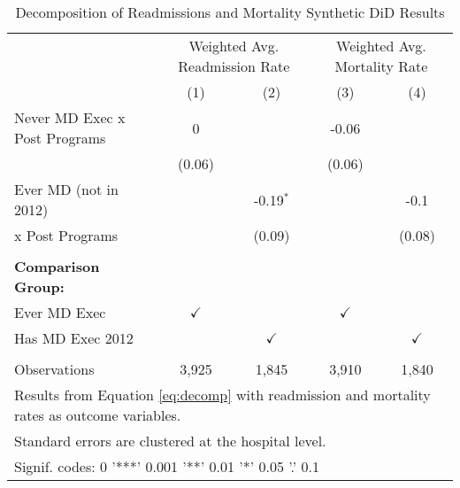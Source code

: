 \begin{table}[ht!]

\caption{\label{tab:MD_noMD_readmort_decomp_synth}Decomposition of Readmissions and Mortality Synthetic DiD Results}
\centering
\begin{tabular}[t]{lcccc}
\toprule
\multicolumn{1}{c}{ } & \multicolumn{2}{c}{Weighted Avg. Readmission Rate} & \multicolumn{2}{c}{Weighted Avg. Mortality Rate} \\
 & (1) & (2) & (3) & (4)\\
\midrule
Never MD Exec x Post Programs & 0 &  & -0.06 & \\
 & (0.06) &  & (0.06) & \\
Ever MD (not in 2012) &  & -0.19$^{*}$ &  & -0.1\\
 \hspace{3mm} x Post Programs &  & (0.09) &  & (0.08)\\
 &  &  &  & \\
\addlinespace
\textbf{Comparison Group:} &  &  &  & \\
Ever MD Exec & $\checkmark$ &  & $\checkmark$ & \\
Has MD Exec 2012 &  & $\checkmark$ &  & $\checkmark$\\
 &  &  &  & \\
Observations & 3,925 & 1,845 & 3,910 & 1,840\\
\bottomrule
\multicolumn{5}{l}{\textsuperscript{} Results from Equation \ref{eq:decomp} with readmission and mortality rates as outcome variables.}\\
\multicolumn{5}{l}{\textsuperscript{} Standard errors are clustered at the hospital level.}\\
\multicolumn{5}{l}{\textsuperscript{} Signif. codes: 0 '***' 0.001 '**' 0.01 '*' 0.05 '.' 0.1}\\
\end{tabular}
\end{table}
